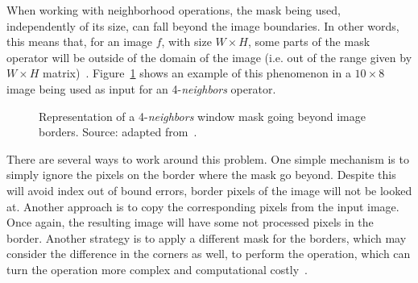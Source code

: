 When working with neighborhood operations, the mask being used, independently of its size, can fall beyond the image boundaries. In other words, this means that, for an image $f$, with size $W \times H$, some parts of the mask operator will be outside of the domain of the image (i.e. out of the range given by $W \times H$ matrix)~\citep{pedrini:08}. Figure~\ref{fig:img_boundaries} shows an example of this phenomenon in a $10 \times 8$ image being used as input for an 4-\textit{neighbors} operator.

\begin{figure}[ht]
    \centering

    \caption[Representation of a 4-\textit{neighbors} window mask going beyond image borders]{Representation of a 4-\textit{neighbors} window mask going beyond image borders. Source: adapted from~\citet{pedrini:08}.}
    \label{fig:img_boundaries}
\end{figure}

There are several ways to work around this problem. One simple mechanism is to simply ignore the pixels on the border where the mask go beyond. Despite this will avoid index out of bound errors, border pixels of the image will not be looked at. Another approach is to copy the corresponding pixels from the input image. Once again, the resulting image will have some not processed pixels in the border. Another strategy is to apply a different mask for the borders, which may consider the difference in the corners as well, to perform the operation, which can turn the operation more complex and computational costly~\citep{pedrini:08}.


